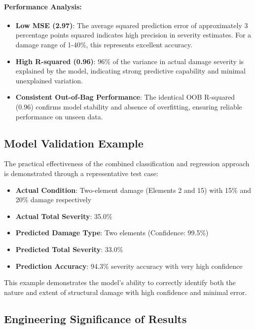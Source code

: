 \documentclass[11pt,a4paper]{article}
\begin{document}
\paragraph{Performance Analysis:}

\begin{itemize}
    \item \textbf{Low MSE (2.97)}: The average squared prediction error of approximately 3 percentage points squared indicates high precision in severity estimates. For a damage range of 1-40\%, this represents excellent accuracy.
    
    \item \textbf{High R-squared (0.96)}: 96\% of the variance in actual damage severity is explained by the model, indicating strong predictive capability and minimal unexplained variation.
    
    \item \textbf{Consistent Out-of-Bag Performance}: The identical OOB R-squared (0.96) confirms model stability and absence of overfitting, ensuring reliable performance on unseen data.
\end{itemize}

\subsection{Model Validation Example}

The practical effectiveness of the combined classification and regression approach is demonstrated through a representative test case:

\begin{itemize}
    \item \textbf{Actual Condition}: Two-element damage (Elements 2 and 15) with 15\% and 20\% damage respectively
    \item \textbf{Actual Total Severity}: 35.0\%
    \item \textbf{Predicted Damage Type}: Two elements (Confidence: 99.5\%)
    \item \textbf{Predicted Total Severity}: 33.0\%
    \item \textbf{Prediction Accuracy}: 94.3\% severity accuracy with very high confidence
\end{itemize}

This example demonstrates the model's ability to correctly identify both the nature and extent of structural damage with high confidence and minimal error.

\subsection{Engineering Significance of Results}
\end{document}

